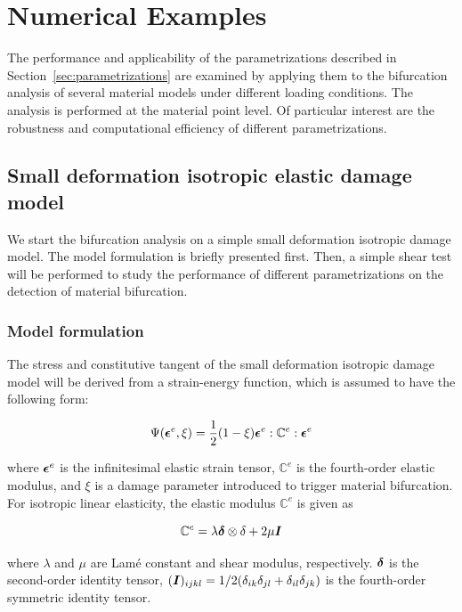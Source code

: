 \documentclass[12pt]{article}
\numberwithin{equation}{section}
\begin{document}
\section{Numerical Examples}
\label{sec:numerical-examples}

The performance and applicability of the parametrizations described in
Section~\ref{sec:parametrizations} are examined by applying them to 
the bifurcation analysis of several material models under different 
loading conditions. The analysis is performed at the material point 
level. Of particular interest are the robustness and computational 
efficiency of different parametrizations.

\subsection{Small deformation isotropic elastic damage model}
\label{subsec:isotropic}

We start the bifurcation analysis on a simple small deformation 
isotropic damage model. The model formulation is briefly presented 
first. Then, a simple shear test will be performed to study the 
performance of different parametrizations on the detection of material 
bifurcation.

\subsubsection{Model formulation}
The stress and constitutive tangent of the small deformation isotropic 
damage model will be derived from a strain-energy function, which is 
assumed to have the following form:

\begin{equation}\label{eq:iso_psi}
 \Psi({\boldsymbol{\epsilon}} ^e, \xi)
   = \frac{1}{2} (1 - \xi) 
     {\boldsymbol{\epsilon}} ^e : \mathbb{C}^e : {\boldsymbol{\epsilon}} ^e
\end{equation}

where ${\boldsymbol{\epsilon}}^e$ is the infinitesimal elastic strain tensor, 
$\mathbb{C}^e$ is the fourth-order elastic modulus, and $\xi$ 
is a damage parameter introduced to trigger material bifurcation. For 
isotropic linear elasticity, the elastic modulus $\mathbb{C}^e$ is 
given as

\begin{equation}
  \mathbb{C}^e = \lambda {\boldsymbol{\delta}}\otimes\delta + 2\mu{\boldsymbol{I}}
\end{equation}

where $\lambda$ and $\mu$ are Lam\'{e} constant and shear modulus,
respectively. ${\boldsymbol{\delta}}$ is the second-order identity tensor,
$({\boldsymbol{I}})_{ijkl} = 1/2(\delta_{ik}\delta_{jl} +
\delta_{il}\delta_{jk})$ is the fourth-order symmetric identity
tensor.
\end{document}
